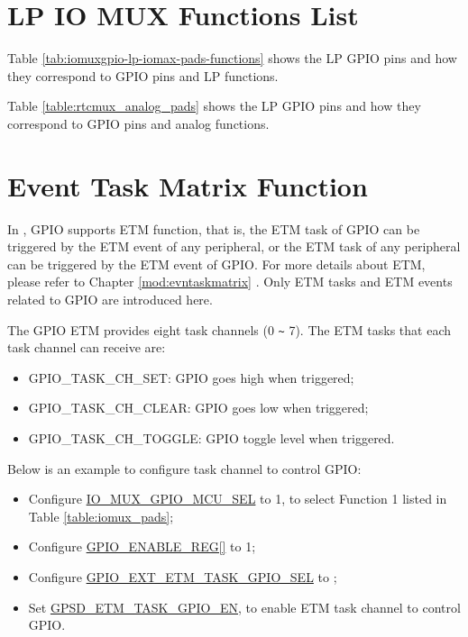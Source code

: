 \documentclass[main\_\_EN.tex]{subfiles}
\begin{document}


\section{LP IO MUX Functions List}
\label{sec:rtcmux_pins}
Table  \ref{tab:iomuxgpio-lp-iomax-pads-functions} shows the LP GPIO pins and how they correspond to GPIO pins and LP functions.  



Table \ref{table:rtcmux_analog_pads} shows the LP GPIO pins and how they correspond to GPIO pins and analog functions.




\section{Event Task Matrix Function}

In \chipname{} , GPIO supports ETM function, that is, the ETM task of GPIO can be triggered by the ETM event of any peripheral, or the ETM task of any peripheral can be triggered by the ETM event of GPIO. For more details about ETM, please refer to Chapter \ref{mod:evntaskmatrix} \textit{}. Only ETM tasks and ETM events related to GPIO are introduced here.

The GPIO ETM provides eight task channels  (0 \verb+~+ 7). The ETM tasks that each task channel can receive are:

\begin{itemize}
    \item GPIO\_TASK\_CH\_SET: GPIO goes high when triggered;
    \item GPIO\_TASK\_CH\_CLEAR: GPIO goes low when triggered;
    \item GPIO\_TASK\_CH\_TOGGLE: GPIO toggle level when triggered.
\end{itemize}

Below is an example to configure task channel   to control GPIO:

\begin{itemize}
    \item Configure \hyperref[fielddesc:IOMUXGPIONMCUSEL]{IO\_MUX\_GPIO\_MCU\_SEL} to 1, to select Function 1 listed in Table \ref{table:iomux_pads};
    \item Configure \hyperref[regdesc:GPIOENABLEREG]{GPIO\_ENABLE\_REG[]} to 1;
    \item Configure \hyperref[fielddesc:GPIOSDETMTASKGPIO0SEL]{GPIO\_EXT\_ETM\_TASK\_GPIO\_SEL} to ;
    \item Set \hyperref[fielddesc:GPIOSDETMTASKGPIO0EN]{GPSD\_ETM\_TASK\_GPIO\_EN}, to enable ETM task channel  to control GPIO.
\end{itemize}
\end{document}
